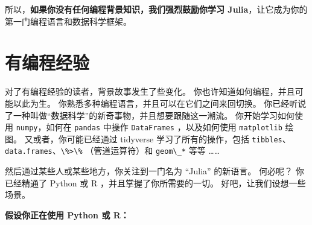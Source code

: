 \documentclass[
  notoc %
]{tufte-book}
\newcommand{\passthrough}[1]{#1}
\begin{document}
所以，\textbf{如果你没有任何编程背景知识，我们强烈鼓励你学习
Julia}，让它成为你的第一门编程语言和数据科学框架。

\hypertarget{sec:programmers}{%
\section{有编程经验}\label{sec:programmers}}

对了有编程经验的读者，背景故事发生了些变化。
你也许知道如何编程，并且可能以此为生。
你熟悉多种编程语言，并且可以在它们之间来回切换。
你已经听说了一种叫做``数据科学''的新奇事物，并且想要跟随这一潮流。
你开始学习如何使用 \passthrough{\lstinline!numpy!}，如何在
\passthrough{\lstinline!pandas!} 中操作
\passthrough{\lstinline!DataFrames!} ，以及如何使用
\passthrough{\lstinline!matplotlib!} 绘图。 又或者，你可能已经通过
tidyverse 学习了所有的操作，包括
\passthrough{\lstinline!tibbles!}、\passthrough{\lstinline!data.frames!}、\passthrough{\lstinline!\%>\%!}
（管道运算符）和 \passthrough{\lstinline!geom\_*!} 等等 \ldots\ldots{}

然后通过某些人或某些地方，你关注到一门名为 ``Julia'' 的新语言。 何必呢？
你已经精通了 Python 或 R ，并且掌握了你所需要的一切。
好吧，让我们设想一些场景。

\textbf{假设你正在使用 Python 或 R：}
\end{document}
